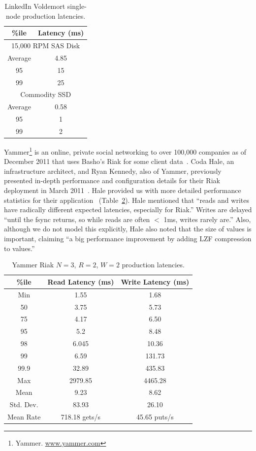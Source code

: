 \documentclass{vldb}
\begin{document}
\begin{table}
\centering
\begin{tabular}{|c|c|}
\hline
\%ile & Latency (ms) \\
\hline
\multicolumn{2}{|c|}{ 15,000 RPM SAS Disk}\\
\hline
Average & 4.85\\
95 & 15\\
99 & 25\\
\hline
\multicolumn{2}{|c|}{ Commodity SSD }\\
\hline
Average & 0.58 \\
95 & 1\\
99 & 2\\
\hline
\end{tabular}
\vspace{-6pt}
\caption{LinkedIn Voldemort single-node production latencies.}
\vspace{-4pt}
\label{table:linkedin}
\end{table}

Yammer\footnote{Yammer. \url{www.yammer.com}} is an online, private
social networking to over 100,000 companies as of December 2011 that
uses Basho's Riak for some client data~\cite{riak}.  Coda Hale, an
infrastructure architect, and Ryan Kennedy, also of Yammer, previously
presented in-depth performance and configuration details for their
Riak deployment in March 2011~\cite{riakyammer}.  Hale provided us
with more detailed performance statistics for their
application~\cite{codapc} (Table~\ref{table:yammer}).  Hale mentioned
that ``reads and writes have radically different expected latencies,
especially for Riak.''  Writes are delayed ``until the fsync returns,
so while reads are often $<$ 1ms, writes rarely are.''  Also, although
we do not model this explicitly, Hale also noted that the size of
values is important, claiming ``a big performance improvement by
adding LZF compression to values.''

\begin{table}
\centering
\begin{tabular}{|c|c|c|}
\hline
\%ile & Read Latency (ms) & Write Latency (ms)\\
\hline
Min & 1.55 & 1.68\\
50 & 3.75 & 5.73 \\
75 & 4.17 & 6.50\\
95 & 5.2 & 8.48\\
98 & 6.045 & 10.36 \\
99 & 6.59 & 131.73\\
99.9 & 32.89 & 435.83\\
Max & 2979.85 &  4465.28 \\
\hline
Mean & 9.23 & 8.62 \\
Std. Dev. & 83.93 & 26.10\\
\hline
Mean Rate & 718.18 gets/s & 45.65 puts/s\\
\hline
\end{tabular}
\vspace{-4pt}
\caption{Yammer Riak $N$$=$$3$, $R$$=$$2$, $W$$=$$2$ production latencies.}
\vspace{-12pt}
\label{table:yammer}
\end{table}
\end{document}
